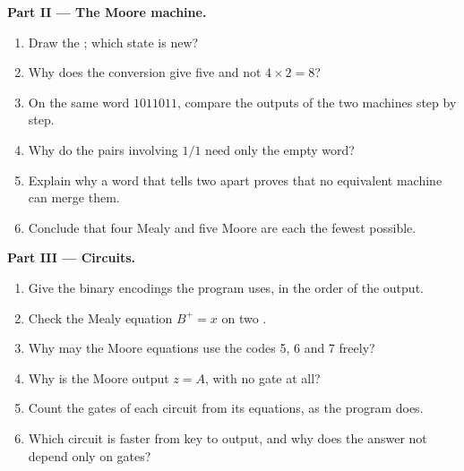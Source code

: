 \begin{problem}
\medskip\noindent\textbf{Part II --- The Moore machine.}
\begin{enumerate}[resume]
\item Draw the ; which state is new?
\item Why does the conversion give five  and not $4 \times 2 = 8$?
\item On the same word $1011011$, compare the outputs of the two machines step by step.
\item Why do the pairs involving $1/1$ need only the empty word?
\item Explain why a word that tells two  apart proves that no equivalent machine can merge them.
\item Conclude that four Mealy  and five Moore  are each the fewest possible.
\end{enumerate}

\medskip\noindent\textbf{Part III --- Circuits.}
\begin{enumerate}[resume]
\item Give the binary encodings the program uses, in the order of the output.
\item Check the Mealy equation $B^+ = x$ on two .
\item Why may the Moore equations use the codes 5, 6 and 7 freely?
\item Why is the Moore output $z = A$, with no gate at all?
\item Count the gates of each circuit from its equations, as the program does.
\item Which circuit is faster from key to output, and why does the answer not depend only on gates?
\end{enumerate}


\end{problem}
